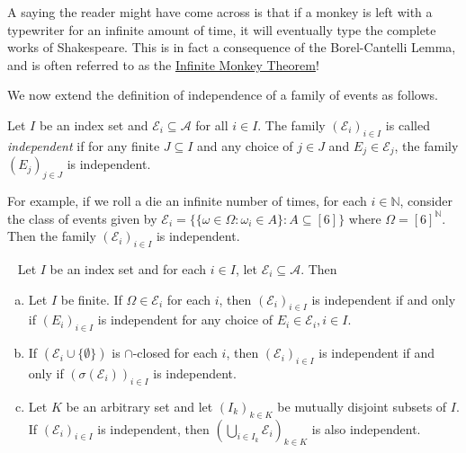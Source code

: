 A saying the reader might have come across is that if a monkey is left with a typewriter for an infinite amount of time, it will eventually type the complete works of Shakespeare. This is in fact a consequence of the Borel-Cantelli Lemma, and is often referred to as the \href{https://en.wikipedia.org/wiki/Infinite_monkey_theorem}{Infinite Monkey Theorem}!

\vspace{2mm}
We now extend the definition of independence of a family of events as follows.

\begin{definition}
\label{independence of classes of events}
    Let $I$ be an index set and $\mathcal{E}_i\subseteq\mathcal{A}$ for all $i\in I$. The family $(\mathcal{E}_i)_{i\in I}$ is called \textit{independent} if for any finite $J\subseteq I$ and any choice of $j\in J$ and $E_j\in\mathcal{E}_j$, the family $(E_j)_{j\in J}$ is independent.
\end{definition}

For example, if we roll a die an infinite number of times, for each $i\in\mathbb{N}$, consider the class of events given by $\mathcal{E}_i=\{\{\omega\in\Omega:\omega_i\in A\}:A\subseteq[6]\}$
where $\Omega=[6]^\mathbb{N}$. Then the family $(\mathcal{E}_i)_{i\in I}$ is independent.

\begin{ftheo}
\label{independent set classes subset}
~
    Let $I$ be an index set and for each $i\in I$, let $\mathcal{E}_i\subseteq \mathcal{A}$. Then
    \begin{enumerate}[(a)]
        \item Let $I$ be finite. If $\Omega\in\mathcal{E}_i$ for each $i$, then $(\mathcal{E}_i)_{i\in I}$ is independent if and only if $(E_i)_{i\in I}$ is independent for any choice of $E_i\in\mathcal{E}_i, i\in I$.
        
        \item If $(\mathcal{E}_i\cup\{\emptyset\})$ is $\cap$-closed for each $i$, then $(\mathcal{E}_i)_{i\in I}$ is independent if and only if $(\sigma(\mathcal{E}_i))_{i\in I}$ is independent.
        
        \item Let $K$ be an arbitrary set and let $(I_k)_{k\in K}$ be mutually disjoint subsets of $I$. If $(\mathcal{E}_i)_{i\in I}$ is independent, then $\left(\bigcup_{i\in I_k}\mathcal{E}_i\right)_{k\in K}$ is also independent.
    \end{enumerate}
\end{ftheo}

